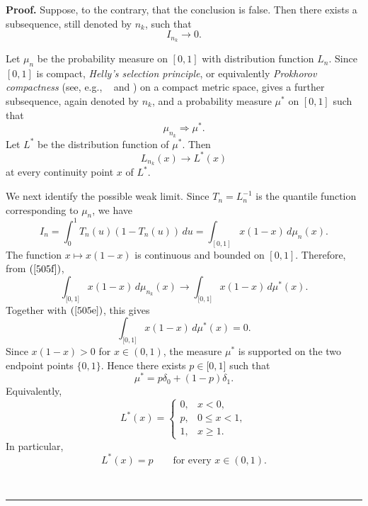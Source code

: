 \documentclass[onecolumn]{article}
\newenvironment{proof}[1][Proof]{\noindent\textbf{#1.} }{\ \rule{0.5em}{0.5em}}
\begin{document}
\begin{proof}
\noindent Suppose, to the contrary, that the conclusion is false. Then there
exists a subsequence, still denoted by $n_{k}$, such that 
\begin{equation}
I_{n_{k}}\rightarrow 0.  \label{505e}
\end{equation}

Let $\mu _{n}$ be the probability measure on $[0,1]$ with distribution
function $L_{n}$. Since $[0,1]$ is compact, \textit{Helly's selection
principle}, or equivalently \textit{Prokhorov compactness }(see, e.g.,%
\textit{\ }\cite[Chapter 1]{[68]} and \cite[Chapter 23]{[75]}) on a compact
metric space, gives a further subsequence, again denoted by $n_{k}$, and a
probability measure $\mu ^{\ast }$ on $[0,1]$ such that 
\begin{equation}
\mu _{n_{k}}\Rightarrow \mu ^{\ast }.  \label{505f}
\end{equation}%
Let $L^{\ast }$ be the distribution function of $\mu ^{\ast }$. Then 
\begin{equation}
L_{n_{k}}(x)\rightarrow L^{\ast }(x)  \label{505g}
\end{equation}%
at every continuity point $x$ of $L^{\ast }$.

We next identify the possible weak limit. Since $T_{n}=L_{n}^{-1}$ is the
quantile function corresponding to $\mu _{n}$, we have 
\begin{equation}
I_{n}=\int_{0}^{1}T_{n}(u)(1-T_{n}(u))\,du=\int_{[0,1]}x(1-x)\,d\mu _{n}(x).
\label{505h}
\end{equation}%
The function $x\mapsto x(1-x)$ is continuous and bounded on $[0,1]$.
Therefore, from $(\ref{505f})$, 
\begin{equation}
\int_{\lbrack 0,1]}x(1-x)\,d\mu _{n_{k}}(x)\longrightarrow \int_{\lbrack
0,1]}x(1-x)\,d\mu ^{\ast }(x).  \label{505i}
\end{equation}%
Together with $(\ref{505e})$, this gives 
\begin{equation}
\int_{\lbrack 0,1]}x(1-x)\,d\mu ^{\ast }(x)=0.  \label{505j}
\end{equation}%
Since $x(1-x)>0$ for $x\in (0,1)$, the measure $\mu ^{\ast }$ is supported
on the two endpoint points $\{0,1\}$. Hence there exists $p\in \lbrack 0,1]$
such that 
\begin{equation}
\mu ^{\ast }=p\delta _{0}+(1-p)\delta _{1}.  \label{505k}
\end{equation}%
Equivalently, 
\begin{equation}
L^{\ast }(x)=%
\begin{cases}
0, & x<0, \\ 
p, & 0\leq x<1, \\ 
1, & x\geq 1.%
\end{cases}
\label{505l}
\end{equation}%
In particular, 
\begin{equation}
L^{\ast }(x)=p\qquad \text{for every }x\in (0,1).  \label{505m}
\end{equation}


\end{proof}
\end{document}
